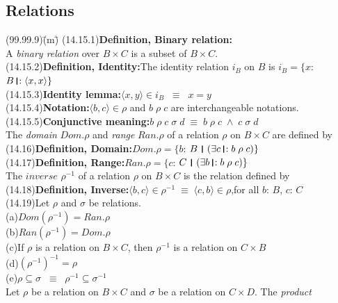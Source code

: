 \documentclass{amsart}
\newcommand{\lgap}{2pt}                             %
\newcommand{\llgap}{6pt}                            %
\newcommand{\equivs}{\ensuremath{\;\equiv\;}}       %
\newcommand{\equivss}{\ensuremath{\;\;\equiv\;\;}}  %
\newcommand{\thedr}{\rule[-.25ex]{.32mm}{1.75ex}}   %
\newcommand{\dr}{\;\,\thedr\,\;}                    %
\newcommand{\drrb}{\;\thedr\,{:}\;}                 %
\newcommand{\ext}{\exists}                          %
\begin{document}
\subsection*{Relations}
\begin{tabbing}
(99.99.9)\;\=(m)\;\=\kill
(14.15.1)\>\textbf{Definition, Binary relation:}\\[\lgap]
         \>A \emph{binary relation} over $B\times C$ is a subset of $B\times C$.\\[\lgap]
(14.15.2)\>\textbf{Definition, Identity:}\quad The identity relation $i_{B}$ on $B$ is $i_{B} = \{x$: $B\drrb \langle x,x\rangle \}$\\[\lgap]
(14.15.3)\>\textbf{Identity lemma:}\quad $\langle x,y\rangle \in i_{B}\equivss x=y$\\[\lgap]
(14.15.4)\>\textbf{Notation:}\quad $\langle b,c\rangle \in \rho$ and $b\;\rho\;c$ are interchangeable notations.\\[\lgap]
(14.15.5)\>\textbf{Conjunctive meaning:}\quad $b\; \rho\; c\; \sigma\; d \equivs b\; \rho\; c\; \land\; c\; \sigma\; d$\\[\lgap]
The \emph{domain} $Dom.\rho$ and \emph{range} $Ran.\rho$ of a relation $\rho$ on $B\times C$ are defined by\\[\lgap]
(14.16)\>\textbf{Definition, Domain:}\quad $Dom.\rho = \{b$: $B\dr (\ext c\drrb b\; \rho\; c)\}$\\[\lgap]
(14.17)\>\textbf{Definition, Range:}\quad $Ran.\rho = \{c$: $C\dr (\ext b\drrb b\; \rho\; c)\}$\\[\llgap]
The $inverse$ $\rho^{-1}$ of a relation $\rho$ on $B\times C$ is the relation defined by\\[\lgap]
(14.18)\>\textbf{Definition, Inverse:}\quad $\langle b,c\rangle \in \rho^{-1} \equivs \langle c,b\rangle\in \rho$,\quad for all $b$: $B$, $c$: $C$\\[\lgap]
(14.19)\>Let $\rho$ and $\sigma$ be relations.\\[\lgap]
      \>(a)\>$Dom(\rho^{-1}) = Ran.\rho$\\[\lgap]
      \>(b)\>$Ran(\rho^{-1}) = Dom.\rho$\\[\lgap]
      \>(c)\>If $\rho$ is a relation on $B\times C$, then $\rho^{-1}$ is a relation on $C\times B$\\[\lgap]
      \>(d)\>$(\rho^{-1})^{-1} = \rho$\\[\lgap]
      \>(e)\>$\rho\subseteq \sigma \equivss \rho^{-1}\subseteq \sigma^{-1}$\\[\llgap]
Let $\rho$ be a relation on $B\times C$ and $\sigma$ be a relation on $C\times D$. The \emph{product}\\[\lgap]

\end{tabbing}
\end{document}
